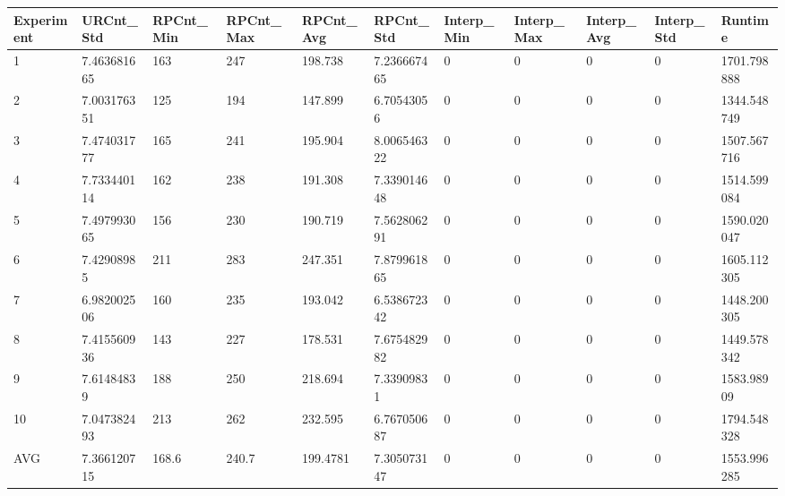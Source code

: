 \begin{table}[H]
\begin{adjustbox}{max width=380pt,keepaspectratio,angle=90}
\begin{tabular}{|l|l|l|l|l|l|l|l|l|l|l|}
				\end{tabular}
			\end{adjustbox}
			\begin{adjustbox}{max width=380pt,keepaspectratio,angle=90}
				\begin{tabular}{|l|l|l|l|l|l|l|l|l|l|l|}
					\hline
					\rowcolor[HTML]{EFEFEF} 
					Experiment & URCnt\_Std  & RPCnt\_Min & RPCnt\_Max & RPCnt\_Avg & RPCnt\_Std  & Interp\_Min & Interp\_Max & Interp\_Avg & Interp\_Std & Runtime     \\ \hline
					1          & 7.463681665 & 163        & 247        & 198.738    & 7.236667465 & 0           & 0           & 0           & 0           & 1701.798888 \\ \hline
					2          & 7.003176351 & 125        & 194        & 147.899    & 6.70543056  & 0           & 0           & 0           & 0           & 1344.548749 \\ \hline
					3          & 7.474031777 & 165        & 241        & 195.904    & 8.006546322 & 0           & 0           & 0           & 0           & 1507.567716 \\ \hline
					4          & 7.733440114 & 162        & 238        & 191.308    & 7.339014648 & 0           & 0           & 0           & 0           & 1514.599084 \\ \hline
					5          & 7.497993065 & 156        & 230        & 190.719    & 7.562806291 & 0           & 0           & 0           & 0           & 1590.020047 \\ \hline
					6          & 7.42908985  & 211        & 283        & 247.351    & 7.879961865 & 0           & 0           & 0           & 0           & 1605.112305 \\ \hline
					7          & 6.982002506 & 160        & 235        & 193.042    & 6.538672342 & 0           & 0           & 0           & 0           & 1448.200305 \\ \hline
					8          & 7.415560936 & 143        & 227        & 178.531    & 7.675482982 & 0           & 0           & 0           & 0           & 1449.578342 \\ \hline
					9          & 7.61484839  & 188        & 250        & 218.694    & 7.33909831  & 0           & 0           & 0           & 0           & 1583.98909  \\ \hline
					10         & 7.047382493 & 213        & 262        & 232.595    & 6.767050687 & 0           & 0           & 0           & 0           & 1794.548328 \\ \hline
					AVG        & 7.366120715 & 168.6      & 240.7      & 199.4781   & 7.305073147 & 0           & 0           & 0           & 0           & 1553.996285 \\ \hline
				\end{tabular}
			\end{adjustbox}	
		\end{table}

